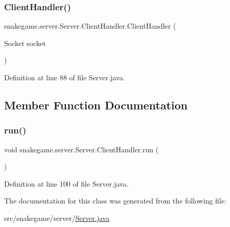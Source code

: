 \subsubsection{\texorpdfstring{Client\+Handler()}{ClientHandler()}}
{\footnotesize\ttfamily snakegame.\+server.\+Server.\+Client\+Handler.\+Client\+Handler (\begin{DoxyParamCaption}\item[{Socket}]{socket }\end{DoxyParamCaption})}



Definition at line 88 of file Server.\+java.



\subsection{Member Function Documentation}
\mbox{\label{classsnakegame_1_1server_1_1_server_1_1_client_handler_a5cb1108121c65a4e73e8c55e0f6d97e8}} 
\subsubsection{\texorpdfstring{run()}{run()}}
{\footnotesize\ttfamily void snakegame.\+server.\+Server.\+Client\+Handler.\+run (\begin{DoxyParamCaption}{ }\end{DoxyParamCaption})}



Definition at line 100 of file Server.\+java.



The documentation for this class was generated from the following file\+:\begin{DoxyCompactItemize}
\item 
src/snakegame/server/\mbox{\hyperlink{_server_8java}{Server.\+java}}\end{DoxyCompactItemize}
